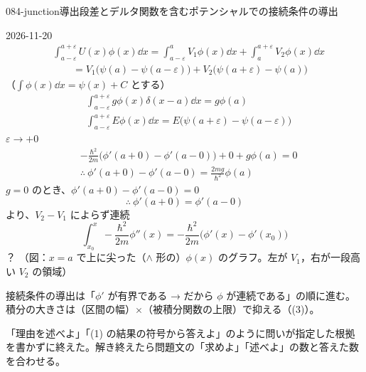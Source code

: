 \documentclass[uplatex,dvipdfmx,a4paper,11pt]{jsarticle}
\begin{document}
\begin{mondai}{084-junction}{導出}{段差とデルタ関数を含むポテンシャルでの接続条件の導出}
\begin{kotaeutsushi}{2026-11-20}
\begin{align*}
&\int_{a-\varepsilon}^{a+\varepsilon}U(x)\phi(x)\dd x=\int_{a-\varepsilon}^{a}V_{1}\phi(x)\dd x+\int_{a}^{a+\varepsilon}V_{2}\phi(x)\dd x\\
&\qquad=V_{1}\bigl(\psi(a)-\psi(a-\varepsilon)\bigr)+V_{2}\bigl(\psi(a+\varepsilon)-\psi(a)\bigr)
\end{align*}
（$\int\phi(x)\dd x=\psi(x)+C$ とする）
\begin{align*}
&\int_{a-\varepsilon}^{a+\varepsilon}g\phi(x)\delta(x-a)\dd x=g\phi(a)\\
&\int_{a-\varepsilon}^{a+\varepsilon}E\phi(x)\dd x=E\bigl(\psi(a+\varepsilon)-\psi(a-\varepsilon)\bigr)
\end{align*}
$\varepsilon\to+0$
\begin{align*}
&-\frac{\hbar^{2}}{2m}\bigl(\phi'(a+0)-\phi'(a-0)\bigr)+0+g\phi(a)=0\\
&\therefore\ \phi'(a+0)-\phi'(a-0)=\frac{2mg}{\hbar^{2}}\phi(a)
\end{align*}
$g=0$ のとき、$\phi'(a+0)-\phi'(a-0)=0$
\[ \therefore\ \phi'(a+0)=\phi'(a-0) \]
より、$V_{2}-V_{1}$ によらず連続
\[ \int_{x_{0}}^{x}-\frac{\hbar^{2}}{2m}\phi''(x)=-\frac{\hbar^{2}}{2m}\bigl(\phi'(x)-\phi'(x_{0})\bigr) \]
？
（図：$x=a$ で上に尖った（$\wedge$ 形の）$\phi(x)$ のグラフ。左が $V_{1}$，右が一段高い $V_{2}$ の領域）
\end{kotaeutsushi}
\begin{kizuki}
\item 接続条件の導出は「$\phi'$ が有界である → だから $\phi$ が連続である」の順に進む。積分の大きさは（区間の幅）$\times$（被積分関数の上限）で抑える（(3)）。
\item {} 「理由を述べよ」「(1) の結果の符号から答えよ」のように問いが指定した根拠を書かずに終えた。解き終えたら問題文の「求めよ」「述べよ」の数と答えた数を合わせる。

\end{kizuki}
\end{mondai}
\end{document}
